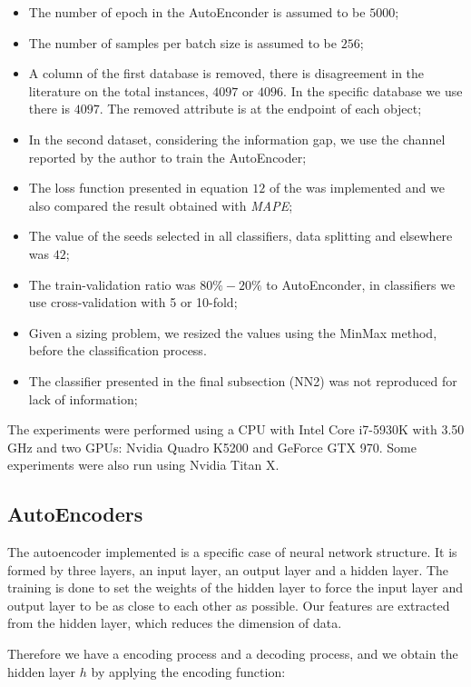 \begin{itemize}
\item The number of epoch in the AutoEnconder is assumed to be $5000$; 
\item The number of samples per batch size is assumed to be $256$; 
\item A column of the first database is removed, there is disagreement in the literature on the total instances, $4097$ or $4096$. In the specific database we use there is $4097$. The removed attribute is at the endpoint of each object; 
\item In the second dataset, considering the information gap, we use the channel reported by the author to train the AutoEncoder;
\item The loss function presented in equation $12$ of the \cite{WenZha:2018} was implemented and we also compared the result obtained with \textit{MAPE}; 
\item The value of the seeds selected in all classifiers, data splitting and elsewhere was $42$; 
\item The train-validation ratio was $80\%-20\%$ to AutoEnconder, in classifiers we use cross-validation with 5 or 10-fold; 
\item Given a sizing problem, we resized the values using the MinMax method, before the classification process.
\item The classifier presented in the final subsection (NN2) was not reproduced for lack of information; 
\end{itemize}

The experiments were performed using a CPU with Intel Core i7-5930K with 3.50 GHz and two GPUs: Nvidia Quadro K5200 and GeForce GTX 970. Some experiments were also run using Nvidia Titan X.

\subsection{AutoEncoders}

The autoencoder implemented is a specific case of neural network structure. It is formed by three layers, an input layer, an output layer and a hidden layer. The training is done to set the weights of the hidden layer to force the input layer and output layer to be as close to each other as possible. Our features are extracted from the hidden layer, which reduces the dimension of data. 

Therefore we have a encoding process and a decoding process, and we obtain the hidden layer $h$ by applying the encoding function:


